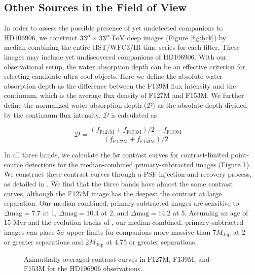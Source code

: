 \documentclass[twocolumn]{aastex62}
\newcommand{\mjup}{\ensuremath{M_\mathrm{Jup}}\xspace}
\begin{document}
\subsection{Other Sources in the Field of View}
In order to assess the possible presence of yet undetected companions to HD106906, we construct $33\mbox{$^{\prime\prime}$}\times33\mbox{$^{\prime\prime}$}$ FoV deep images (Figure \ref{fig:bck}) by median-combining the entire HST/WFC3/IR time series for each filter. These images may include yet undiscovered companions of HD106906. With our observational setup, the water absorption depth can be an effective criterion for selecting candidate ultra-cool objects. Here we define the absolute water absorption depth as the difference between the F139M flux intensity and the continuum, which is the average flux {density} of F127M and F153M. We further define the normalized water absorption depth ($\mathcal{D}$) as the absolute depth divided by the continuum flux intensity. $\mathcal{D}$ is calculated as

\begin{equation}
\mathcal{D} = \frac{(f_{\mathrm{F127M}} + f_{\mathrm{F153M}})/2 - f_{\mathrm{F139M}}}{(f_{\mathrm{F127M}} + f_{\mathrm{F153M}})/2}
\end{equation}

In all three bands, we calculate the $5\sigma$ contrast curves for contrast-limited point-source detections for the median-combined primary-subtracted images (Figure \ref{fig:contrast_curve}). We construct these contrast curves through a PSF injection-and-recovery process, as detailed in  \citet{Zhou2019}.  We find that the three bands  have almost the same contrast curves, although the F127M image has the deepest the contrast at large separation.  Our median-combined, primary-subtracted images are sensitive to $\Delta \mbox{mag}=7.7$ at 1\arcsec, $\Delta \mbox{mag}=10.4$ at 2\arcsec, and $\Delta \mbox{mag}=14.2$ at 5\arcsec. Assuming an age of 15 Myr and the evolution tracks of \citet{Saumon2008}, our median-combined, primary-subtracted images can place 5$\sigma$ upper limits for companions more massive than 7\mjup{} at 2\arcsec{} or greater  separations and 2\mjup{} at 4.75\arcsec{} or greater  separations.

\begin{figure}
  \centering
  \caption{Azimuthally averaged contrast curves in F127M, F139M, and F153M for the HD106906 observations.}
  \label{fig:contrast_curve}
\end{figure}
\end{document}
